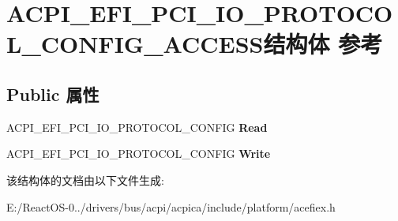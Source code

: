 \hypertarget{struct_a_c_p_i___e_f_i___p_c_i___i_o___p_r_o_t_o_c_o_l___c_o_n_f_i_g___a_c_c_e_s_s}{}\section{A\+C\+P\+I\+\_\+\+E\+F\+I\+\_\+\+P\+C\+I\+\_\+\+I\+O\+\_\+\+P\+R\+O\+T\+O\+C\+O\+L\+\_\+\+C\+O\+N\+F\+I\+G\+\_\+\+A\+C\+C\+E\+S\+S结构体 参考}
\label{struct_a_c_p_i___e_f_i___p_c_i___i_o___p_r_o_t_o_c_o_l___c_o_n_f_i_g___a_c_c_e_s_s}
\subsection*{Public 属性}
\begin{DoxyCompactItemize}
\item 
\mbox{\label{struct_a_c_p_i___e_f_i___p_c_i___i_o___p_r_o_t_o_c_o_l___c_o_n_f_i_g___a_c_c_e_s_s_a0ef89049af0410113b364ea62bb0b4a0}} 
A\+C\+P\+I\+\_\+\+E\+F\+I\+\_\+\+P\+C\+I\+\_\+\+I\+O\+\_\+\+P\+R\+O\+T\+O\+C\+O\+L\+\_\+\+C\+O\+N\+F\+IG {\bfseries Read}
\item 
\mbox{\label{struct_a_c_p_i___e_f_i___p_c_i___i_o___p_r_o_t_o_c_o_l___c_o_n_f_i_g___a_c_c_e_s_s_a8e9a68d1dce58151703b1a9a3c5707d0}} 
A\+C\+P\+I\+\_\+\+E\+F\+I\+\_\+\+P\+C\+I\+\_\+\+I\+O\+\_\+\+P\+R\+O\+T\+O\+C\+O\+L\+\_\+\+C\+O\+N\+F\+IG {\bfseries Write}
\end{DoxyCompactItemize}


该结构体的文档由以下文件生成\+:\begin{DoxyCompactItemize}
\item 
E\+:/\+React\+O\+S-\/0../drivers/bus/acpi/acpica/include/platform/acefiex.\+h\end{DoxyCompactItemize}
